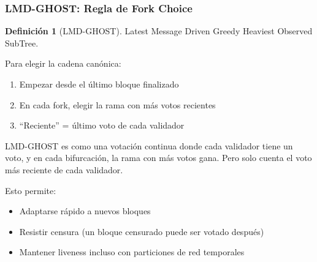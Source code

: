 \documentclass[11pt,a4paper,twoside,openright]{book}
\theoremstyle{definition}
\newtheorem{definition}{Definición}[chapter]
\theoremstyle{plain}
\theoremstyle{remark}
\begin{document}
\begin{center}
\end{center}

\subsubsection{LMD-GHOST: Regla de Fork Choice}

\begin{definition}[LMD-GHOST]
Latest Message Driven Greedy Heaviest Observed SubTree.

Para elegir la cadena canónica:
\begin{enumerate}
    \item Empezar desde el último bloque finalizado
    \item En cada fork, elegir la rama con más votos recientes
    \item ``Reciente'' = último voto de cada validador
\end{enumerate}
\end{definition}

\begin{intuicion}
LMD-GHOST es como una votación continua donde cada validador tiene un voto, y en cada bifurcación, la rama con más votos gana. Pero solo cuenta el voto más reciente de cada validador.

Esto permite:
\begin{itemize}
    \item Adaptarse rápido a nuevos bloques
    \item Resistir censura (un bloque censurado puede ser votado después)
    \item Mantener liveness incluso con particiones de red temporales
\end{itemize}
\end{intuicion}
\end{document}
